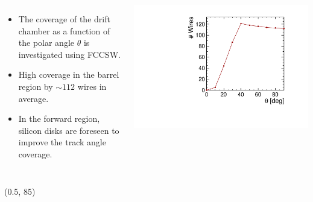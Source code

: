 \documentclass[final,xcolor={dvipsnames,svgnames,x11names,table}]{beamer}
\begin{document}
\begin{frame}
\begin{textblock}{39.5}
\begin{tcolorbox}[title=The simulation of the drift chamber with FCCSW]
\begin{columns}
    \end{columns}


    \begin{columns}
      \begin{itemize}
        \item The coverage of the drift chamber as a function of the polar angle $\theta$ is investigated using FCCSW.
        \item High coverage in the barrel region by $\sim 112$ wires in average.
        \item In the forward region, silicon disks are foreseen to improve the track angle coverage.
      \end{itemize}

        \centering
        \includegraphics[width=\textwidth]{Figures/numWires}
    \end{columns}

  \end{tcolorbox}
\end{textblock}



\begin{textblock}{43}(0.5, 85)
  \begin{tcolorbox}[title=Beam-induced backgrounds and the impact on the drift chamber]


\end{tcolorbox}
\end{textblock}
\end{frame}
\end{document}
